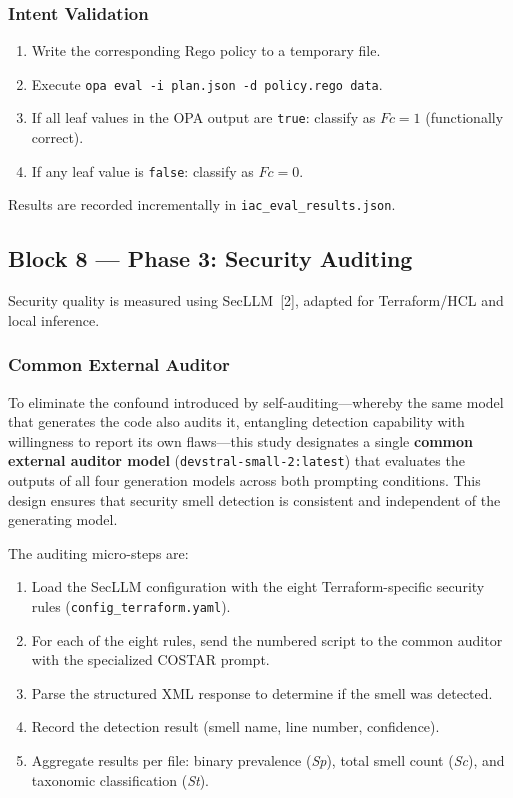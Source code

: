 \subsubsection{Intent Validation}

\begin{enumerate}[leftmargin=*]
    \item Write the corresponding Rego policy to a temporary file.
    \item Execute \texttt{opa eval -i plan.json -d policy.rego data}.
    \item If all leaf values in the OPA output are \texttt{true}:
          classify as $Fc = 1$ (functionally correct).
    \item If any leaf value is \texttt{false}: classify as $Fc = 0$.
\end{enumerate}

Results are recorded incrementally in
\texttt{iac\_eval\_results.json}.

\subsection{Block 8 --- Phase 3: Security Auditing}
\label{sec:block8}

Security quality is measured using SecLLM~[2], adapted for
Terraform/HCL and local inference.

\subsubsection{Common External Auditor}

To eliminate the confound introduced by self-auditing---whereby the
same model that generates the code also audits it, entangling
detection capability with willingness to report its own
flaws---this study designates a single \textbf{common external
auditor model} (\texttt{devstral-small-2:latest}) that evaluates
the outputs of all four generation models across both prompting
conditions. This design ensures that security smell detection is
consistent and independent of the generating model.

The auditing micro-steps are:

\begin{enumerate}[leftmargin=*]
    \item Load the SecLLM configuration with the eight
          Terraform-specific security rules
          (\texttt{config\_terraform.yaml}).
    \item For each of the eight rules, send the numbered script to
          the common auditor with the specialized COSTAR prompt.
    \item Parse the structured XML response to determine if the
          smell was detected.
    \item Record the detection result (smell name, line number,
          confidence).
    \item Aggregate results per file: binary prevalence (\textit{Sp}),
          total smell count (\textit{Sc}), and taxonomic
          classification (\textit{St}).
\end{enumerate}

